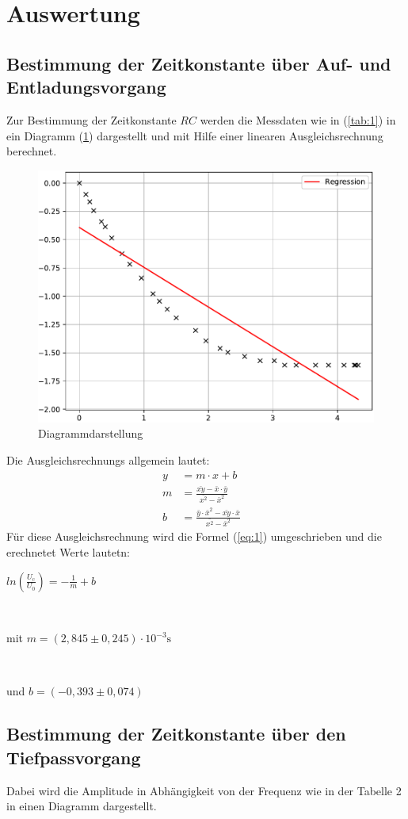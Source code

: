 

\section{Auswertung}
\subsection{Bestimmung der Zeitkonstante über Auf- und Entladungsvorgang}
Zur Bestimmung der Zeitkonstante $RC$ werden die Messdaten wie in (\ref{tab:1})
in ein Diagramm (\ref{fig:1}) dargestellt und mit Hilfe einer linearen Ausgleichsrechnung
berechnet.

\begin{figure}[H]
  \centering
  \includegraphics[width=\textwidth]{Diagramm1.pdf}
  \caption{Diagrammdarstellung}
  \label{fig:1}
\end{figure}
Die Ausgleichsrechnungs allgemein lautet:
\begin{align}
  y & = m \cdot x + b \label{eq:}\\
  m & = \frac {\bar{xy} - \bar{x} \cdot \bar{y}} {\bar{x^2} -\bar{x}^2}&  \label{eq:}\\
  b & = \frac {\bar{y} \cdot \bar{x}^2 - \bar{xy} \cdot \bar{x}} {\bar{x^2}-\bar{x}^2}& \label{eq:}
\end{align}
Für diese Ausgleichsrechnung wird die Formel (\ref{eq:1}) umgeschrieben und die erechnetet Werte lautetn: \\
\newline
\centerline{$ln(\frac{U_\text{c}}{U_\text{0}}) = -\frac{1}{m} + b$}\\
\newline
\centerline{mit $m = (2,845 \pm 0,245) \cdot 10^{-3} \si{\second}$}\\
\newline
\centerline{und $b = (-0,393 \pm 0,074)$}
\newline
\subsection{Bestimmung der Zeitkonstante über den Tiefpassvorgang}
Dabei wird die Amplitude in Abhängigkeit von der Frequenz wie in der Tabelle 2 in
einen Diagramm dargestellt.



